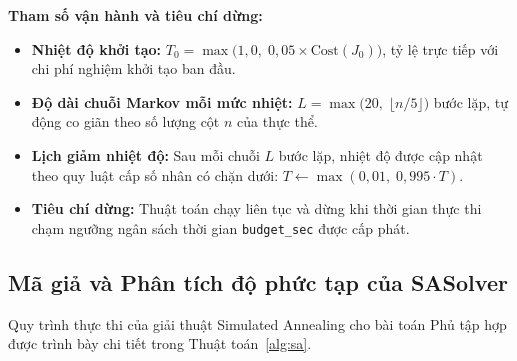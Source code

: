 \documentclass[11pt, a4paper]{article}
\begin{document}
\textbf{Tham số vận hành và tiêu chí dừng:}
\begin{itemize}
    \item \textbf{Nhiệt độ khởi tạo:} $T_0 = \max\big(1{,}0,\; 0{,}05 \times \text{Cost}(J_0)\big)$, tỷ lệ trực tiếp với chi phí nghiệm khởi tạo ban đầu.
    \item \textbf{Độ dài chuỗi Markov mỗi mức nhiệt:} $L = \max\big(20,\; \lfloor n / 5 \rfloor\big)$ bước lặp, tự động co giãn theo số lượng cột $n$ của thực thể.
    \item \textbf{Lịch giảm nhiệt độ:} Sau mỗi chuỗi $L$ bước lặp, nhiệt độ được cập nhật theo quy luật cấp số nhân có chặn dưới: $T \leftarrow \max(0{,}01,\; 0{,}995 \cdot T)$.
    \item \textbf{Tiêu chí dừng:} Thuật toán chạy liên tục và dừng khi thời gian thực thi chạm ngưỡng ngân sách thời gian \texttt{budget\_sec} được cấp phát.
\end{itemize}

\subsection{Mã giả và Phân tích độ phức tạp của SASolver}
Quy trình thực thi của giải thuật Simulated Annealing cho bài toán Phủ tập hợp được trình bày chi tiết trong Thuật toán~\ref{alg:sa}.
\end{document}
